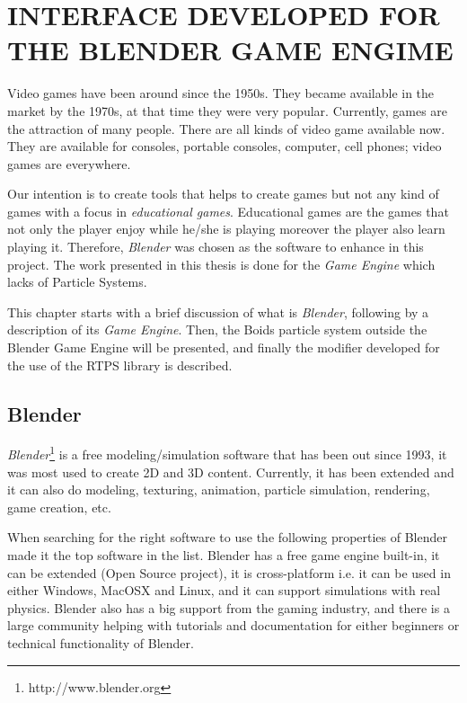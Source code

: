 \chapter{INTERFACE DEVELOPED FOR THE BLENDER GAME ENGIME}\label{chap5}


Video games have been around since the 1950s\cite{computerVideoGamesHistory}. They became available in the market by the 1970s, at that time they were very popular. Currently, games are the attraction of many people. There are all kinds of video game available now. They are available for consoles, portable consoles, computer, cell phones; video games are everywhere. 

Our intention is to create tools that helps to create games but not any kind of games with a focus in \textit{educational games}. Educational games are the games that not only the player enjoy while he/she is playing moreover the player also learn playing it. Therefore, \textit{Blender} was chosen as the software to enhance in this project. The work presented in this thesis is done for the \textit{Game Engine} which lacks of Particle Systems.

This chapter starts with a brief discussion of what is \textit{Blender}, following by a description of its \textit{Game Engine}. Then, the Boids particle system outside the Blender Game Engine will be presented, and finally the modifier developed for the use of the RTPS library is described.

\section{Blender}\label{blenderSec}
\textit{Blender}\footnote{http://www.blender.org} is a free modeling/simulation software that has been out since 1993, it was most used to create 2D and 3D content. Currently, it has been extended and it can also do modeling, texturing, animation, particle simulation, rendering, game creation, etc.

When searching for the right software to use the following properties of Blender made it the top software in the list. Blender has a free game engine built-in, it can be extended (Open Source project), it is cross-platform i.e. it can be used in either Windows, MacOSX and Linux, and it can support simulations with real physics. Blender also has a big support from the gaming industry, and there is a large community helping with tutorials and documentation for either beginners or technical functionality of Blender.

